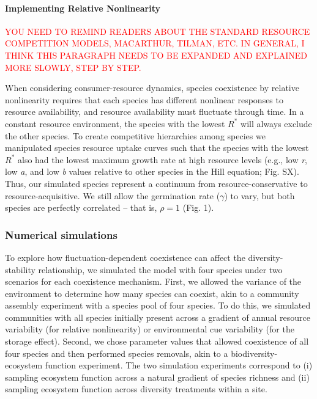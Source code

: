 \documentclass[12pt,]{article}
\begin{document}
\paragraph{Implementing Relative
Nonlinearity}\label{implementing-relative-nonlinearity}

\textcolor{red}{YOU NEED TO REMIND READERS ABOUT THE STANDARD RESOURCE COMPETITION MODELS, MACARTHUR, TILMAN, ETC. IN GENERAL, I THINK THIS PARAGRAPH NEEDS TO BE EXPANDED AND EXPLAINED MORE SLOWLY, STEP BY STEP.}

When considering consumer-resource dynamics, species coexistence by
relative nonlinearity requires that each species has different nonlinear
responses to resource availability, and resource availability must
fluctuate through time. In a constant resource environment, the species
with the lowest \(R^*\) will always exclude the other species. To create
competitive hierarchies among species we manipulated species resource
uptake curves such that the species with the lowest \(R^*\) also had the
lowest maximum growth rate at high resource levels (e.g., low \emph{r},
low \emph{a}, and low \emph{b} values relative to other species in the
Hill equation; Fig. SX). Thus, our simulated species represent a
continuum from resource-conservative to resource-acquisitive. We still
allow the germination rate (\(\gamma\)) to vary, but both species are
perfectly correlated -- that is, \(\rho=1\) (Fig. 1).

\subsubsection{Numerical simulations}\label{numerical-simulations}

To explore how fluctuation-dependent coexistence can affect the
diversity-stability relationship, we simulated the model with four
species under two scenarios for each coexistence mechanism. First, we
allowed the variance of the environment to determine how many species
can coexist, akin to a community assembly experiment with a species pool
of four species. To do this, we simulated communities with all species
initially present across a gradient of annual resource variability (for
relative nonlinearity) or environmental cue variability (for the storage
effect). Second, we chose parameter values that allowed coexistence of
all four species and then performed species removals, akin to a
biodiversity-ecosystem function experiment. The two simulation
experiments correspond to (i) sampling ecosystem function across a
natural gradient of species richness and (ii) sampling ecosystem
function across diversity treatments within a site.
\end{document}
